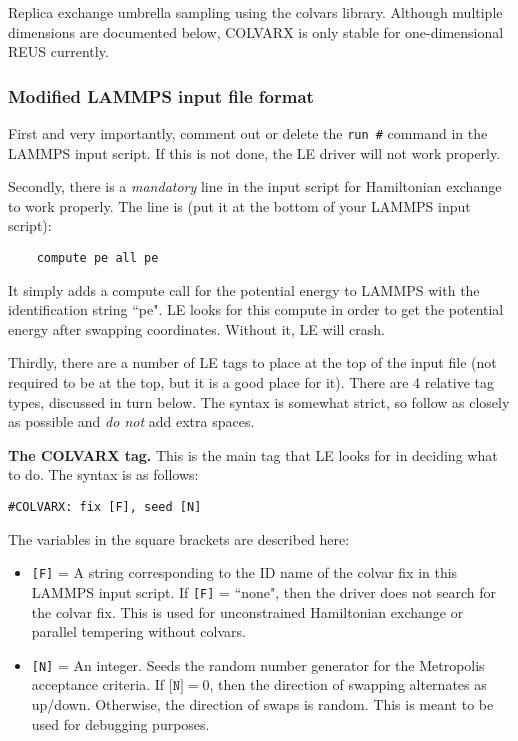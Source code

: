 \documentclass[10pt]{article}
\begin{document}
Replica exchange umbrella sampling using the colvars library. Although multiple dimensions are documented below,
COLVARX is only stable for one-dimensional REUS currently.

\subsubsection{Modified LAMMPS input file format}

First and very importantly, comment out
or delete the \texttt{run \#} command in the LAMMPS input script. If this is not done,
the LE driver will not work properly. 

Secondly, there is a {\em mandatory} line in the input script for Hamiltonian exchange to work properly.
The line is (put it at the bottom of your LAMMPS input script):
\begin{verbatim}
	compute pe all pe
\end{verbatim}
It simply adds a compute call for the potential energy to LAMMPS with the identification string ``pe". LE looks
for this compute in order to get the potential energy after swapping coordinates. Without it, LE will crash.

Thirdly, there are a number of LE tags to place
at the top of the input file (not required to be at the top, but it is a good place for it). 
There are 4 relative tag types, discussed in turn below. The syntax is somewhat strict,
so follow as closely as possible and {\em do not} add extra spaces.

\textbf{The COLVARX tag.}
This is the main tag that LE looks for in deciding what to do.
The syntax is as follows:
\begin{verbatim}
#COLVARX: fix [F], seed [N]
\end{verbatim}
The variables in the square brackets are described here:
\begin{itemize}
\item	\texttt{[F]} = A string corresponding to the ID name of the colvar fix
		in this LAMMPS input script. If \texttt{[F]} = ``none", then the driver does
		not search for the colvar fix. This is used for unconstrained Hamiltonian exchange
		or parallel tempering without colvars.
\item	\texttt{[N]} = An integer. Seeds the random number generator for the Metropolis
		acceptance criteria.
		If $\texttt{[N]} = 0$,
		then the direction of swapping alternates as up/down. Otherwise, the direction of swaps
		is random. This is meant to be used for debugging purposes.
\end{itemize}
\end{document}
